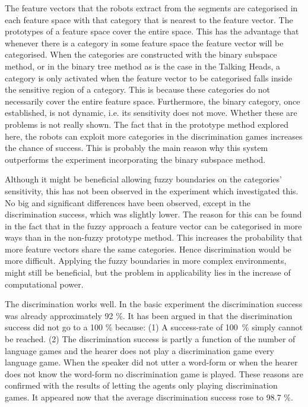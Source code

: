 The feature vectors that the robots extract from the segments are categorised in each feature space with that category that is nearest to the feature vector. The prototypes of a feature space cover the entire space. This has the advantage that whenever there is a category in some feature space the feature vector will be categorised. When the categories are constructed with the binary subspace method, or in the binary tree method \citep{steels:1996b} as is the case in the Talking Heads, a category is only activated when the feature vector to be categorised falls inside the sensitive region of a category. This is because these categories do not necessarily cover the entire feature space. Furthermore, the binary category, once established, is not dynamic, i.e. its sensitivity does not move. Whether these are problems is not really shown. The fact that in the prototype method explored here, the robots can exploit more categories in the discrimination games increases the chance of success. This is probably the main reason why this system outperforms the experiment incorporating the binary subspace method.

Although it might be beneficial allowing fuzzy boundaries on the categories' sensitivity, this has not been observed in the experiment which investigated this. No big and significant differences have been observed, except in the discrimination success, which was slightly lower. The reason for this can be found in the fact that in the fuzzy approach a feature vector can be categorised in more ways than in the non-fuzzy prototype method. This increases the probability that more feature vectors share the same categories. Hence discrimination would be more difficult. Applying the fuzzy boundaries in more complex environments, might still be beneficial, but the problem in applicability lies in the increase of computational power.


The discrimination works well. In the basic experiment the discrimination success was already approximately 92 \%. It has been argued in  that the discrimination success did not go to a 100 \% because: (1) A success-rate of 100~\% simply cannot be reached. (2) The discrimination success is partly a function of the number of language games and the hearer does not play a discrimination game every language game. When the speaker did not utter a word-form or when the hearer does not know the word-form no discrimination game is played. These reasons are confirmed with the results of letting the agents only playing discrimination games. It appeared now that the average discrimination success rose to 98.7 \%.

